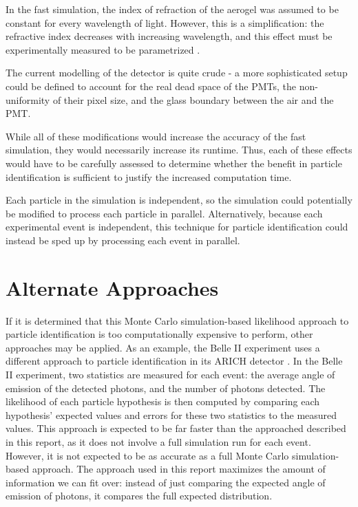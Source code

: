 In the fast simulation, the index of refraction of the aerogel was assumed to be constant for every wavelength of light.
However, this is a simplification: the refractive index decreases with increasing wavelength, and this effect must be experimentally measured to be parametrized \cite{aerogelrefrac}.

The current modelling of the detector is quite crude - a more sophisticated setup could be defined to account for the real dead space of the PMTs, the non-uniformity of their pixel size, and the glass boundary between the air and the PMT.

While all of these modifications would increase the accuracy of the fast simulation, they would necessarily increase its runtime. 
Thus, each of these effects would have to be carefully assessed to determine whether the benefit in particle identification is sufficient to justify the increased computation time.

Each particle in the simulation is independent, so the simulation could potentially be modified to process each particle in parallel. 
Alternatively, because each experimental event is independent, this technique for particle identification could instead be sped up by processing each event in parallel.

\section{Alternate Approaches}
If it is determined that this Monte Carlo simulation-based likelihood approach to particle identification is too computationally expensive to perform, other approaches may be applied.
As an example, the Belle II experiment uses a different approach to particle identification in its ARICH detector \cite{belleArich}.
In the Belle II experiment, two statistics are measured for each event: the average angle of emission of the detected photons, and the number of photons detected.
The likelihood of each particle hypothesis is then computed by comparing each hypothesis' expected values and errors for these two statistics to the measured values.
This approach is expected to be far faster than the approached described in this report, as it does not involve a full simulation run for each event.
However, it is not expected to be as accurate as a full Monte Carlo simulation-based approach.
The approach used in this report maximizes the amount of information we can fit over: instead of just comparing the expected angle of emission of photons, it compares the full expected distribution. 

